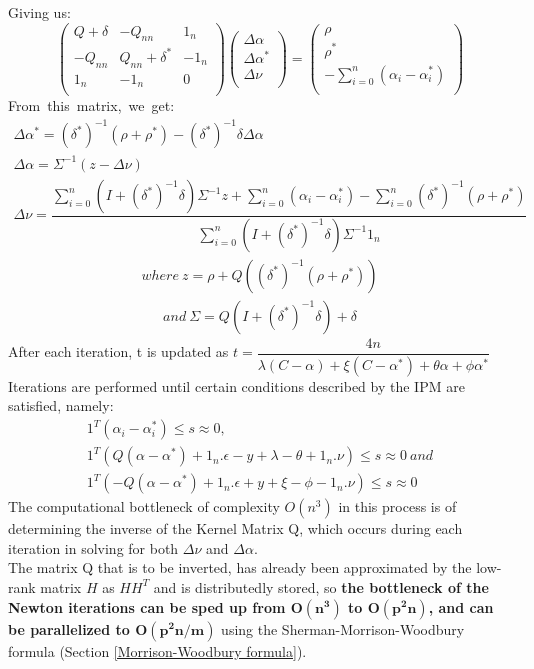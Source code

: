 \documentclass[12pt]{article}
\begin{document}
 Giving us:
 \[
\begin{pmatrix} 
Q+\delta&-Q_{nn}&1_{n}\\
-Q_{nn}&Q_{nn} + \delta^*&-1_{n}\\
1_{n}&-1_{n}&0\\
\end{pmatrix}
\begin{pmatrix} 
\Delta \alpha\\
\Delta \alpha^*\\
\Delta\nu\\
\end{pmatrix}
=
\begin{pmatrix} 
\rho\\
\rho^*\\
-\sum_{i=0}^{n}{(\alpha_{i} - \alpha_{i}^*)}\\
\end{pmatrix}
\]
\belowdisplayskip=0pt
From\ this\ matrix,\ we\ get:\\
 \begin{gather}
\Delta\alpha^*=(\delta^*)^{-1}(\rho + \rho^*) - (\delta^*)^{-1}\delta\Delta\alpha\\
\Delta\alpha=\Sigma^{-1}(z - \Delta\nu)\\
\Delta\nu = \dfrac{\sum_{i=0}^{n}{(I+(\delta^*)^{-1}\delta)\Sigma^{-1}z} + \sum_{i=0}^{n}{(\alpha_{i} - \alpha_{i}^*)} - \sum_{i=0}^{n}{(\delta^*)^{-1}(\rho+\rho^*)}}{\sum_{i=0}^{n}{(I+(\delta^*)^{-1}\delta)\Sigma^{-1}1_{n}}}
\end{gather}
\begin{gather*}
where\ z = \rho + Q((\delta^*)^{-1}(\rho + \rho^*))
\end{gather*}
\begin{gather}
and\ \Sigma={Q(I+(\delta^*)^{-1}\delta) + \delta}
 \end{gather}
 \belowdisplayskip=5pt
 After each iteration, t is updated as $t=\dfrac{4n}{\lambda(C-\alpha) + \xi(C-\alpha^*) + \theta\alpha + \phi\alpha^*}$
\newline\newline
Iterations are performed until certain conditions described by the IPM are satisfied, namely:
  \begin{gather*}
1^T(\alpha_{i} - \alpha_{i}^*) \leq s \approx 0, \\
1^T(Q(\alpha - \alpha^*) + 1_{n}.\epsilon - y + \lambda - \theta + 1_{n}.\nu) \leq s \approx 0\ and \\
1^T( -Q(\alpha - \alpha^*) + 1_{n}.\epsilon + y + \xi - \phi - 1_{n}.\nu) \leq s \approx 0
 \end{gather*}
 The computational bottleneck of complexity $O(n^3)$ in this process is of determining the inverse of the Kernel Matrix Q, which occurs during each iteration in solving for both $\Delta \nu$ and $\Delta \alpha$. \\
The matrix Q that is to be inverted, has already been approximated by the low-rank matrix $H$ as $HH^T$ and is distributedly stored, so  {\bf  the bottleneck of the Newton iterations can be sped up from $\bm{O(n^3)}$ to $\bm{O(p^2n)}$, and can be parallelized to $\bm{O(p^2n/m)}$} using the Sherman-Morrison-Woodbury formula (Section \ref{Morrison-Woodbury formula}).
\end{document}
